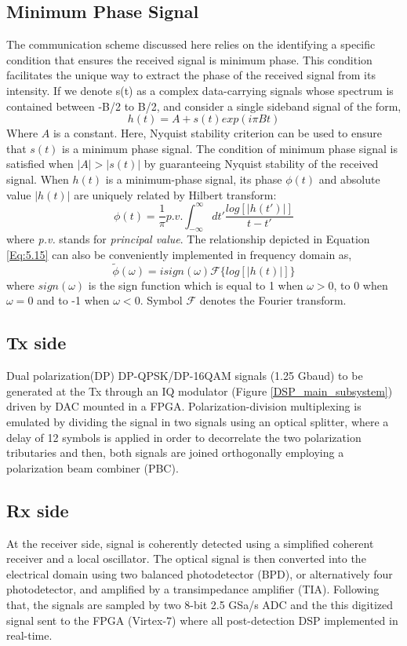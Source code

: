 \subsection{Minimum Phase Signal}
The communication scheme discussed here relies on the identifying a specific condition that ensures the received signal is minimum phase. This condition facilitates the unique way to extract the phase of the received signal from its intensity. If we denote s(t) as a complex data-carrying signals whose spectrum is contained between -B/2 to B/2, and consider a single sideband signal of the form,
\begin{equation}
h(t)=A+s(t)exp(i\pi Bt)
\end{equation}
Where $A$ is a constant. Here, Nyquist stability criterion can be used to ensure that $s(t)$ is a minimum phase signal. The condition of minimum phase signal is satisfied when $|A|>|s(t)|$ by guaranteeing Nyquist stability of the received signal.
When $h(t)$ is a minimum-phase signal, its phase $\phi(t)$ and absolute value $|h(t)|$ are uniquely related by Hilbert transform:
\begin{equation}
	\phi(t)=\frac{1}{\pi}  p.v. \int_{-\infty}^{\infty} dt' \frac{log[|h(t')|]}{t-t'}
	\label{Eq:5.15}
\end{equation}
where \textit{p.v.} stands for \textit{principal value}. The relationship depicted in Equation \ref{Eq:5.15} can also be conveniently implemented in frequency domain as,
\begin{equation}
\tilde{\phi}(\omega)=i sign(\omega) \mathcal{F} \{log[|h(t)|]\}
\end{equation}
where $sign(\omega)$ is the sign function which is equal to 1 when $\omega>0$, to 0 when $\omega=0$ and to -1 when $\omega<0$. Symbol $\mathcal{F}$ denotes the Fourier transform.


\subsection{Tx side}
Dual polarization(DP) DP-QPSK/DP-16QAM signals (1.25 Gbaud) to be generated at the Tx through an IQ modulator (Figure \ref{DSP_main_subsystem}) driven by DAC mounted in a FPGA. Polarization-division multiplexing is emulated by dividing the signal in two signals using an optical splitter, where a delay of 12 symbols is applied in order to decorrelate the two polarization tributaries and then, both signals are joined orthogonally employing a polarization beam combiner (PBC).

\subsection{Rx side}
At the receiver side, signal is coherently detected using a simplified coherent receiver and a local oscillator. The optical signal is then converted into the electrical domain using two balanced photodetector (BPD), or alternatively four photodetector, and amplified by a transimpedance amplifier (TIA). Following that, the signals are sampled by two 8-bit 2.5 GSa/s ADC and the this digitized signal sent to the FPGA (Virtex-7) where all post-detection DSP implemented in real-time.


